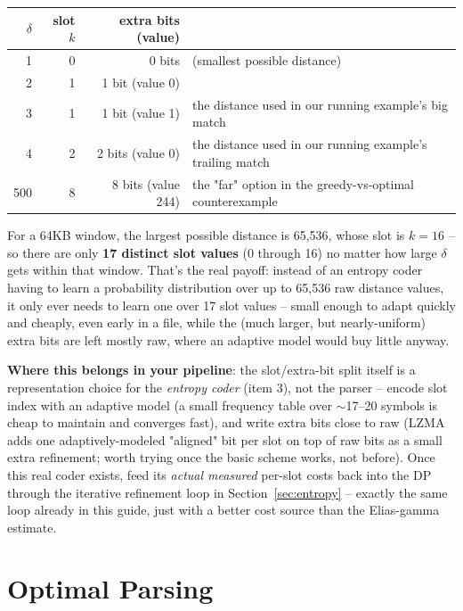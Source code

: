 \documentclass[11pt]{article}
\begin{document}
\begin{tcolorbox}[colback=green!5!white,colframe=green!45!black,title=Worked example: slotting our running example's distances]
\begin{center}
\begin{tabular}{@{}rrrl@{}}
\toprule
$\delta$ & slot $k$ & extra bits (value) & \\
\midrule
1 & 0 & 0 bits & (smallest possible distance) \\
2 & 1 & 1 bit (value 0) & \\
3 & 1 & 1 bit (value 1) & the distance used in our running example's big match \\
4 & 2 & 2 bits (value 0) & the distance used in our running example's trailing match \\
500 & 8 & 8 bits (value 244) & the "far" option in the greedy-vs-optimal counterexample \\
\bottomrule
\end{tabular}
\end{center}
For a 64KB window, the largest possible distance is 65{,}536, whose slot is $k{=}16$ --
so there are only \textbf{17 distinct slot values} (0 through 16) no matter how large
$\delta$ gets within that window. That's the real payoff: instead of an entropy coder
having to learn a probability distribution over up to 65{,}536 raw distance values, it
only ever needs to learn one over 17 slot values -- small enough to adapt quickly and
cheaply, even early in a file, while the (much larger, but nearly-uniform) extra bits
are left mostly raw, where an adaptive model would buy little anyway.
\end{tcolorbox}

\textbf{Where this belongs in your pipeline}: the slot/extra-bit split itself is a
representation choice for the \emph{entropy coder} (item 3), not the parser -- encode
slot index with an adaptive model (a small frequency table over $\sim$17--20 symbols is
cheap to maintain and converges fast), and write extra bits close to raw (LZMA adds one
adaptively-modeled "aligned" bit per slot on top of raw bits as a small extra refinement;
worth trying once the basic scheme works, not before). Once this real coder exists, feed
its \emph{actual measured} per-slot costs back into the DP through the iterative
refinement loop in Section~\ref{sec:entropy} -- exactly the same loop already in this
guide, just with a better cost source than the Elias-gamma estimate.

\section{Optimal Parsing}
\label{sec:parsing}
\end{document}
